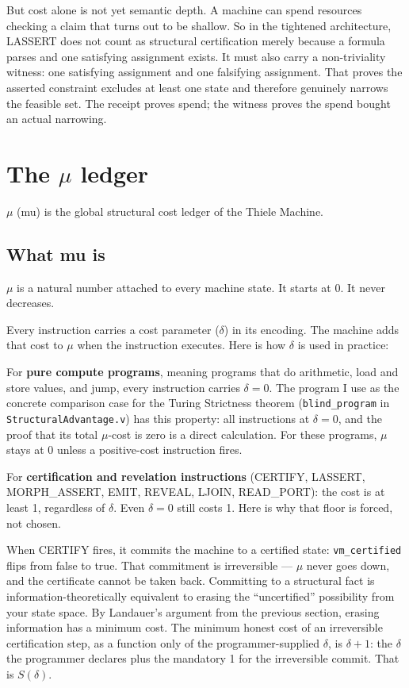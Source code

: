 \documentclass[11pt,a4paper]{article}
\theoremstyle{plain}
\theoremstyle{definition}
\theoremstyle{remark}
\begin{document}
But cost alone is not yet semantic depth. A machine can spend resources checking a claim that turns out to be shallow. So in the tightened architecture, LASSERT does not count as structural certification merely because a formula parses and one satisfying assignment exists. It must also carry a non-triviality witness: one satisfying assignment and one falsifying assignment. That proves the asserted constraint excludes at least one state and therefore genuinely narrows the feasible set. The receipt proves spend; the witness proves the spend bought an actual narrowing.

\section{\texorpdfstring{The $\mu$ ledger}{The mu ledger}}
\label{sec:mu}

$\mu$ (mu) is the global structural cost ledger of the Thiele Machine.

\subsection{What mu is}

$\mu$ is a natural number attached to every machine state. It starts at 0. It never decreases.

Every instruction carries a cost parameter ($\delta$) in its encoding. The machine adds that cost to $\mu$ when the instruction executes. Here is how $\delta$ is used in practice:

For \textbf{pure compute programs}, meaning programs that do arithmetic, load and store values, and jump, every instruction carries $\delta = 0$. The program I use as the concrete comparison case for the Turing Strictness theorem (\texttt{blind\_program} in \texttt{StructuralAdvantage.v}) has this property: all instructions at $\delta = 0$, and the proof that its total $\mu$-cost is zero is a direct calculation. For these programs, $\mu$ stays at 0 unless a positive-cost instruction fires.

For \textbf{certification and revelation instructions} (CERTIFY, LASSERT, MORPH\_ASSERT, EMIT, REVEAL, LJOIN, READ\_PORT): the cost is at least 1, regardless of $\delta$. Even $\delta = 0$ still costs 1. Here is why that floor is forced, not chosen.

When CERTIFY fires, it commits the machine to a certified state: \texttt{vm\_certified} flips from false to true. That commitment is irreversible --- $\mu$ never goes down, and the certificate cannot be taken back. Committing to a structural fact is information-theoretically equivalent to erasing the ``uncertified'' possibility from your state space. By Landauer's argument from the previous section, erasing information has a minimum cost. The minimum honest cost of an irreversible certification step, as a function only of the programmer-supplied $\delta$, is $\delta + 1$: the $\delta$ the programmer declares plus the mandatory 1 for the irreversible commit. That is $S(\delta)$.
\end{document}
